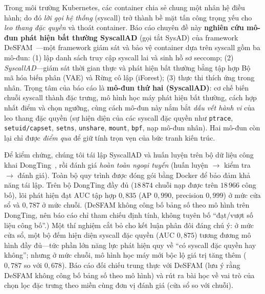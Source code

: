 Trong môi trường Kubernetes, các container chia sẻ chung một nhân hệ điều hành; do
đó \emph{lời gọi hệ thống} (syscall) trở thành bề mặt tấn công trọng yếu cho
\emph{leo thang đặc quyền} và thoát container. Báo cáo chuyên đề này \textbf{nghiên
cứu mô-đun phát hiện bất thường SyscallAD} (gọi tắt SysAD) của framework
DeSFAM~\cite{desfam_original}---một framework giám sát và bảo vệ container dựa trên
syscall gồm ba mô-đun: (1) lập danh sách truy cập syscall lai và sinh hồ sơ seccomp;
(2) \emph{SyscallAD}---giám sát thời gian thực và phát hiện bất thường bằng tập hợp
Bộ mã hóa biến phân (VAE) và Rừng cô lập (iForest); (3) thực thi thích ứng trong
nhân. Trọng tâm của báo cáo là \textbf{mô-đun thứ hai (SyscallAD)}: cơ chế biến
chuỗi syscall thành đặc trưng, mô hình học máy phát hiện bất thường, cách hợp nhất
điểm và chọn ngưỡng, cùng cách mô-đun này nắm bắt \emph{dấu vết hành vi} của leo
thang đặc quyền (sự hiện diện của các syscall đặc quyền như \texttt{ptrace},
\texttt{setuid/capset}, \texttt{setns}, \texttt{unshare}, \texttt{mount},
\texttt{bpf}, nạp mô-đun nhân). Hai mô-đun còn lại chỉ được \emph{điểm qua} để giữ
tính trọn vẹn của bức tranh kiến trúc.

Để kiểm chứng, chúng tôi tái lập SyscallAD và huấn luyện trên bộ dữ liệu công khai
DongTing~\cite{ref26_dongtingdataset}, rồi đánh giá \emph{hoàn toàn ngoại tuyến}
(huấn luyện $\to$ kiểm tra $\to$ đánh giá). Toàn bộ quy trình được đóng gói bằng
Docker để bảo đảm khả năng tái lập. Trên bộ DongTing đầy đủ ($18\,874$ chuỗi nạp được trên $18\,966$ công bố), lõi phát hiện
đạt AUC tập hợp $0{,}835$ (AP $0{,}990$, precision $0{,}999$) ở mức cửa sổ và $0{,}787$
ở mức chuỗi. (DeSFAM không công bố bảng số theo mô hình trên DongTing, nên báo cáo
chỉ tham chiếu định tính, không tuyên bố ``đạt/vượt số liệu công bố''.) Một thí
nghiệm cắt bỏ cho kết luận phân đôi đáng chú ý: ở mức cửa sổ, một
bộ đếm hiện diện syscall đặc quyền (AUC $0{,}875$) tương đương mô hình đầy đủ---tức
phần lớn năng lực phát hiện quy về ``có syscall đặc quyền hay không''; nhưng ở mức
chuỗi, mô hình học máy mới bộc lộ giá trị tăng thêm ($0{,}787$ so với $0{,}678$). Báo
cáo đối chiếu trung thực với DeSFAM (lưu ý rằng DeSFAM không công bố bảng số theo mô
hình) và rút ra bài học về vai trò của chọn lọc đặc trưng theo miền cùng đơn vị đánh
giá (cửa sổ so với chuỗi).
